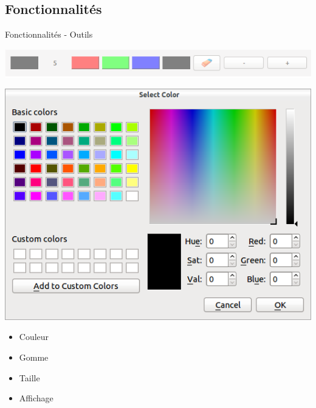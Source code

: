 \documentclass{beamer}
\begin{document}
		\subsection{Fonctionnalités}
		\begin{frame}{Fonctionnalités - Outils}
			\begin{center}\includegraphics[scale=0.45]{toolbar.png}\end{center}
			\begin{center}\includegraphics[scale=0.2]{colorpicker.png}\end{center}
			\begin{itemize}
				\item Couleur
				\item Gomme
				\item Taille
				\item Affichage
			\end{itemize}
		\end{frame}
\end{document}
